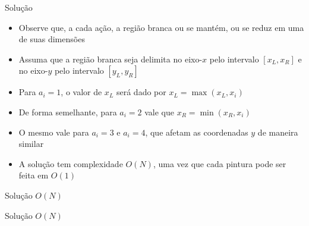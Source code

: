 \begin{frame}[fragile]{Solução}

    \begin{itemize}
        \item Observe que, a cada ação, a região branca ou se mantém, ou se reduz em uma
            de suas dimensões

        \item Assuma que a região branca seja delimita no eixo-$x$ pelo intervalo $[x_L, x_R]$
            e no eixo-$y$ pelo intervalo $[y_L, y_R]$

        \item Para $a_i = 1$, o valor de $x_L$ será dado por $x_L = \max(x_L, x_i)$

        \item De forma semelhante, para $a_i = 2$ vale que $x_R = \min(x_R, x_i)$

        \item O mesmo vale para $a_i = 3$ e $a_i = 4$, que afetam as coordenadas $y$ de maneira
            similar

        \item A solução tem complexidade $O(N)$, uma vez que cada pintura pode ser feita em
            $O(1)$
    \end{itemize}

\end{frame}

\begin{frame}[fragile]{Solução $O(N)$}
\end{frame}

\begin{frame}[fragile]{Solução $O(N)$}
\end{frame}
